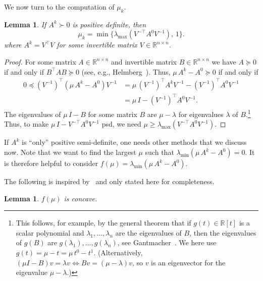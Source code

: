 \documentclass[10pt, a4paper]{article}
\newcommand{\T}{^{\top}}
\newcommand{\R}{\mathds{R}}
\newtheorem{lemma}[theorem]{Lemma}
\begin{document}
We now turn to the computation of $\mu_k$.

\begin{lemma}\label{lem:TightenPosDef}
  If $A^k \succ 0$ is positive definite, then
  \[
    \mu_k = \min \big\{ \lambda_{\max}(V^{-\top} A^0 V^{-1}),\, 1\big\}.
  \]
  where $A^k = V\T V$ for some invertible matrix $V \in \R^{n \times n}$.
\end{lemma}

\begin{proof}
  For some matrix $A \in \R^{n \times n}$ and invertible matrix
  $B \in \R^{n \times n}$ we have $A \succeq 0$ if and only if
  $B\T A B \succeq 0$ (see, e.g., Helmberg~\cite[Prop.~1.1.7]{Hel00}).
  Thus, $\mu\, A^k - A^0 \succeq 0$ if and only if
  \begin{align*}
    0 \preceq (V^{-1})^\top (\mu\, A^k - A^0) V^{-1} &= \mu\,
    (V^{-1})^\top A^k V^{-1} - (V^{-1})^\top A^0 V^{-1} \\
    &= \mu\, I - (V^{-1})^\top A^0 V^{-1}.
  \end{align*}
  The eigenvalues of $\mu\, I - B$ for some matrix $B$ are $\mu - \lambda$
  for eigenvalues $\lambda$ of $B$.\footnote{This follows, for example, by the
    general theorem that if $g(t) \in \R[t]$ is a scalar polynomial and
    $\lambda_1, \dots, \lambda_n$ are the eigenvalues of $B$, then the
    eigenvalues of $g(B)$ are $g(\lambda_1), \dots, g(\lambda_n)$, see
    Gantmacher~\cite[Ch.~IV, Thm.~3]{Gan59I}. We here use
    $g(t) = \mu - t = \mu\, t^0 - t^1$. (Alternatively, $(\mu I - B)v =
    \lambda v \Leftrightarrow Bv = (\mu - \lambda)v$, so $v$ is an
    eigenvector for the eigenvalue $\mu - \lambda$.)}  Thus, to make
  $\mu\, I - V^{-\top} A^0 V^{-1}$ psd, we need
  $\mu \geq \lambda_{\max}(V^{-\top} A^0 V^{-1})$.
\end{proof}

If $A^k$ is ``only'' positive semi-definite, one needs other methods that
we discuss now. Note that we want to find the largest $\mu$ such that
$\lambda_{\min}(\mu\, A^k - A^0) = 0$. It is therefore helpful to consider
$f(\mu) = \lambda_{\min}(\mu\, A^k - A^0)$.

The following is inspired by~\cite{Str16,HigSS16} and only stated here for completeness.

\begin{lemma}
  $f(\mu)$ is concave.
\end{lemma}
\end{document}
